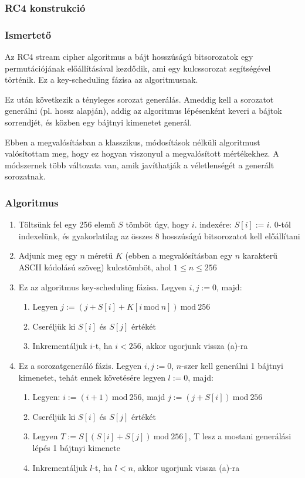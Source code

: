 \documentclass[12pt]{article}
\begin{document}
	\subsubsection{RC4 konstrukció}
	\subsubsection*{Ismertető}
	Az RC4 stream cipher algoritmus a bájt hosszúságú bitsorozatok egy permutációjának előállításával kezdődik, ami egy kulcssorozat segítségével történik. Ez a key-scheduling fázisa az algoritmusnak.
	\par
	Ez után következik a tényleges sorozat generálás. Ameddig kell a sorozatot generálni (pl. hossz alapján), addig az algoritmus lépésenként keveri a bájtok sorrendjét, és közben egy bájtnyi kimenetet generál.
	\par
	Ebben a megvalósításban a klasszikus, módosítások nélküli algoritmust valósítottam meg, hogy ez hogyan viszonyul a megvalósított mértékekhez.
	A módszernek több változata van, amik javíthatják a véletlenségét a generált sorozatnak.
	\subsubsection*{Algoritmus}
	\begin{enumerate}
		\item Töltsünk fel egy 256 elemű $S$ tömböt úgy, hogy $i$. indexére: $S[i]:=i$. 0-tól indexelünk, és gyakorlatilag az összes 8 hosszúságú bitsorozatot kell előállítani
		\item Adjunk meg egy $n$ méretű $K$ (ebben a megvalósításban egy $n$ karakterű ASCII kódolású szöveg) kulcstömböt, ahol $1 \leq n \leq 256$
		\item Ez az algoritmus key-scheduling fázisa. Legyen $i, j:=0$, majd:
			\begin{enumerate}
				\item Legyen $j:=(j+S[i]+K[i \ \textrm{mod}\ n]) \ \textrm{mod} \ 256$
				\item Cseréljük ki $S[i]$ és $S[j]$ értékét
				\item Inkrementáljuk $i$-t, ha $i < 256$, akkor ugorjunk vissza (a)-ra
			\end{enumerate}
		\item Ez a sorozatgeneráló fázis. Legyen $i, j := 0$, $n$-szer kell generálni 1 bájtnyi kimenetet, tehát ennek követésére legyen $l:=0$, majd:
		\begin{enumerate}
			\item Legyen: $i := (i+1) \ \textrm{mod} \ 256$, majd $j := (j + S[i]) \ \textrm{mod} \ 256$
			\item Cseréljük ki $S[i]$ és $S[j]$ értékét
			\item Legyen $T := S[(S[i] + S[j]) \ \textrm{mod} \ 256]$, T lesz a mostani generálási lépés 1 bájtnyi kimenete
			\item Inkrementáljuk $l$-t, ha $l < n$, akkor ugorjunk vissza (a)-ra
		\end{enumerate}
	\end{enumerate}
\end{document}

